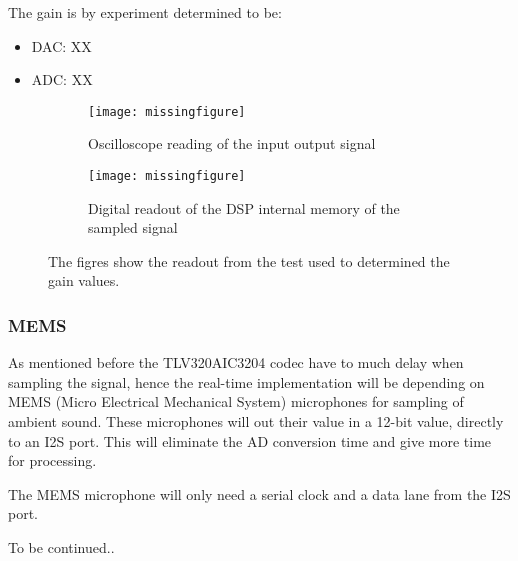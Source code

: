 The gain is by experiment determined to be:
\begin{itemize}
	\item DAC: XX
	\item ADC: XX
\end{itemize}

\begin{figure}[H]
	\centering
	\begin{subfigure}[b]{.45\textwidth}
		\centering
		\texttt{[image: missingfigure]}
		\caption{Oscilloscope reading of the input output signal}
		\label{fig:I2Sconfig}
	\end{subfigure}
	\hfill
	\begin{subfigure}[b]{.45\textwidth}
		\centering
		\texttt{[image: missingfigure]}
		\caption{Digital readout of the DSP internal memory of the sampled signal}
		\label{fig:I2STiming}
	\end{subfigure}	
	\caption{The figres show the readout from the test used to determined the gain values.}
\end{figure}


\subsubsection*{MEMS}


As mentioned before the TLV320AIC3204 codec have to much delay when sampling the signal, hence the real-time implementation will be depending on MEMS (Micro Electrical Mechanical System) microphones for sampling of ambient sound. These microphones will out their value in a 12-bit value, directly to an I2S port. This will eliminate the AD conversion time and give more time for processing.

The MEMS microphone will only need a serial clock and a data lane from the I2S port.

To be continued..